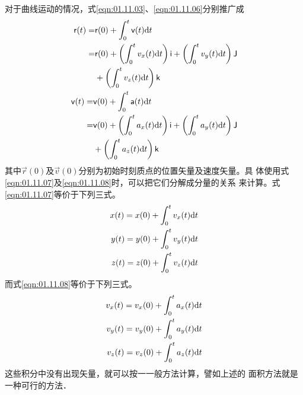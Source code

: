     对于曲线运动的情况，式\eqref{eqn:01.11.03}、\eqref{eqn:01.11.06}分别推广成
{\setlength{\mathindent}{4em}
\setlength\abovedisplayskip{0pt}
\setlength\belowdisplayskip{0pt}
\setlength{\lineskip}{-1pt}
\setlength{\lineskiplimit}{-1pt}
\begin{eqnarray}
    \label{eqn:01.11.07}
    \begin{aligned}
        {\mathsf{r}}(t)=& {\mathsf{r}}(0)+\int_{0}^{t} {\mathsf{v}}(t) {\rm d}  t \\
        =& {\mathsf{r}}(0)
        +\left(\int_{0}^{t} v_{x}(t) {\rm d}  t\right) {\mathsf{i}}
        +\left(\int_{0}^{t} v_{y}(t) {\rm d}  t\right) {\mathsf{J}}  \\
        &+\left(\int_{0}^{t} v_{z}(t) {\rm d}  t\right) {\mathsf{k}}
    \end{aligned} \\
    \label{eqn:01.11.08}
    \begin{aligned}
        {\mathsf{v}}(t)=& {\mathsf{v}}(0)+\int_{0}^{t} {\mathsf{a}}(t) {\rm d}  t \\
        =& {\mathsf{v}}(0)
        +\left(\int_{0}^{t} a_{x}(t) {\rm d}  t\right) {\mathsf{i}}
        +\left(\int_{0}^{t} a_{y}(t) {\rm d}  t\right) {\mathsf{J}} \\
        &+\left(\int_{0}^{t} a_{z}(t) {\rm d}  t\right) {\mathsf{k}}
    \end{aligned}
\end{eqnarray}
\setlength{\mathindent}{6em}}%
其中$\vec{r}(0)$及$\vec{v}(0)$分别为初始时刻质点的位置矢量及速度矢量。具
体使用式\eqref{eqn:01.11.07}及\eqref{eqn:01.11.08}时，可以把它们分解成分量的关系
来计算。式\eqref{eqn:01.11.07}等价于下列三式。
{\setlength\abovedisplayskip{0pt}
    \setlength\belowdisplayskip{0pt}
    \setlength{\lineskip}{-1pt}
    \setlength{\lineskiplimit}{-1pt}
\begin{equation}
    \begin{aligned}\label{eqn:01.11.09}
        x(t)=x(0)+\int_{0}^{t} v_{x}(t) {\rm d}  t \\
        y(t)=y(0)+\int_{0}^{t} v_{y}(t) {\rm d}  t \\
        z(t)=z(0)+\int_{0}^{t} v_{z}(t) {\rm d}  t
    \end{aligned}
\end{equation}}%
而式\eqref{eqn:01.11.08}等价于下列三式。
{\setlength\abovedisplayskip{0pt}
    \setlength\belowdisplayskip{0pt}
    \setlength{\lineskip}{-1pt}
    \setlength{\lineskiplimit}{-1pt}
\begin{equation}\label{eqn:01.11.10}
    \begin{aligned}
        v_x(t)=v_x(0)+\int_{0}^{t} a_{x}(t) {\rm d}  t \\
        v_y(t)=v_y(0)+\int_{0}^{t} a_{y}(t) {\rm d}  t \\
        v_z(t)=v_z(0)+\int_{0}^{t} a_{z}(t) {\rm d}  t
    \end{aligned}
\end{equation}}%
这些积分中没有出现矢量，就可以按一一般方法计算，譬如上述的
面积方法就是一种可行的方法．

